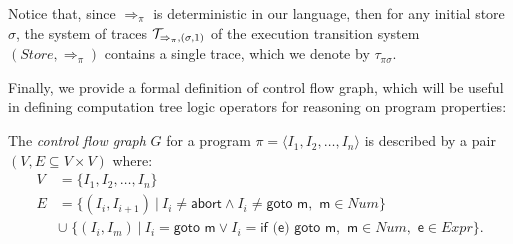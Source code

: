 \noindent Notice that, since $\Rightarrow_{\pi}$ is deterministic in our language, then for any initial store $\sigma$, the system of traces ${\cal T}_{\Rightarrow_{\pi},(\sigma,1)}$ of the execution transition system $(Store,\Rightarrow_{\pi})$ contains a single trace, which we denote by $\tau_{\pi\sigma}$.

Finally, we provide a formal definition of control flow graph, which will be useful in defining computation tree logic operators for reasoning on program properties:

\begin{definition}
\label{de:cfg}
The {\em control flow graph} $G$ for a program $\pi=\langle I_1, I_2, \ldots, I_n \rangle$ is described by a pair $(V, E \subseteq V\times V)$ where:
\begin{equation*}
\begin{align}
V &= \{ I_1, I_2, \ldots, I_n \} \\
E &= \{(I_i, I_{i+1})\:|\: I_i \neq \textsf{abort} \wedge I_i \neq \textsf{goto m}, \!\textsf{ m}\in Num \} \\
&\cup\;\{(I_i, I_m)\:|\: I_i = \textsf{goto m} \vee I_i = \textsf{if (e) goto m}, \!\textsf{ m}\in Num, \!\textsf{ e}\in Expr \}.
\end{align}
\end{equation*}
\end{definition}

